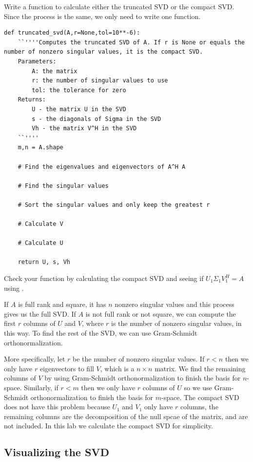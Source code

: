 \begin{problem}
Write a function to calculate either the truncated SVD or the compact SVD.
Since the process is the same, we only need to write one function.

\begin{lstlisting}
def truncated_svd(A,r=None,tol=10**-6):
	``''''Computes the truncated SVD of A. If r is None or equals the number of nonzero singular values, it is the compact SVD.
	Parameters:
		A: the matrix
		r: the number of singular values to use 
		tol: the tolerance for zero
	Returns:
		U - the matrix U in the SVD
		s - the diagonals of Sigma in the SVD
		Vh - the matrix V^H in the SVD
	``''''
	m,n = A.shape
	
	# Find the eigenvalues and eigenvectors of A^H A
	
	# Find the singular values
	
	# Sort the singular values and only keep the greatest r
	
	# Calculate V
	
	# Calculate U
	
	return U, s, Vh
\end{lstlisting}

Check your function by calculating the compact SVD and seeing if $U_1\Sigma_1 V_1^H = A$ using .
\label{prob:calc_svd}
\end{problem}

If $A$ is full rank and square, it has $n$ nonzero singular values and this process gives us the full SVD.
If $A$ is not full rank or not square, we can compute the first $r$ columns of $U$ and $V$, where $r$ is the number of nonzero singular values, in this way.
To find the rest of the SVD, we can use Gram-Schmidt orthonormalization.

More specifically, let $r$ be the number of nonzero singular values.
If $r<n$ then we only have $r$ eigenvectors to fill $V$, which is a $n\times n$ matrix.
We find the remaining columns of $V$ by using Gram-Schmidt orthonormalization to finish the basis for $n$-space.
Similarly, if $r<m$ then we only have $r$ columns of $U$ so we use Gram-Schmidt orthonormalization to finish the basis for $m$-space.
The compact SVD does not have this problem because $U_1$ and $V_1$ only have $r$ columns, the remaining columns are the decomposition of the null spcae of the matrix, and are not included.
In this lab we calculate the compact SVD for simplicity.


\subsection*{Visualizing the SVD}

